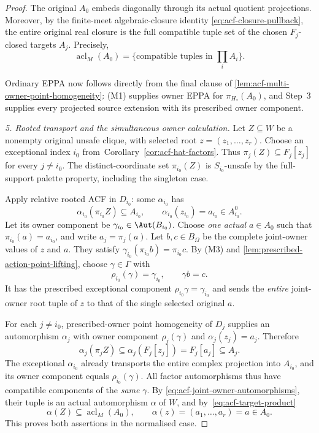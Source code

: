 \begin{proof}
The original \(A_0\) embeds
diagonally through its actual
quotient projections. Moreover,
by the finite-meet algebraic-closure
identity \eqref{eq:acf-closure-pullback},
the entire original real closure
is the full compatible tuple set
of the chosen \(F_j\)-closed
targets \(A_j\). Precisely,
\[
             \operatorname{acl}_M(A_0)
           =\{\text{compatible tuples in }\prod_iA_i\}.
           \tag{\(\square\)}\label{eq:acf-target-product}
\]

Ordinary EPPA now follows directly from the final clause of
\cref{lem:acf-multi-owner-point-homogeneity}: (M1) supplies
owner EPPA for $\pi_{H_*}(A_0)$, and Step~3 supplies every
projected source extension with its prescribed owner component.

\medskip\noindent
\emph{5. Rooted transport and the simultaneous owner calculation.}
Let \(Z\subseteq W\) be a nonempty original
unsafe clique, with selected root
\(z=(z_1,\ldots,z_r)\).
Choose an exceptional index \(i_0\)
from~Corollary~\ref{cor:acf-hat-factors}.  Thus
\(\pi_j(Z)\subseteq F_j[z_j]\)
for every \(j\ne i_0\).
The distinct-coordinate set \(\pi_{i_0}(Z)\)
is \(S_{i_0}\)-unsafe by the full-support
palette property, including the singleton case.

Apply relative rooted ACF in \(D_{i_0}\):
some \(\alpha_{i_0}\) has
\[
 \alpha_{i_0}(\pi_{i_0}Z)\subseteq A_{i_0},
 \qquad
 \alpha_{i_0}(z_{i_0})=a_{i_0}
                           \in A_{i_0}^0.
\]
Let its owner component be
\(\gamma_{i_0}\in\Aut(B_{i_0})\).
Choose \emph{one actual} \(a\in A_0\)
such that \(\pi_{i_0}(a)=a_{i_0}\),
and write \(a_j=\pi_j(a)\).
Let \(b,c\in B_\Omega\) be the
complete joint-owner values of
\(z\) and \(a\).
They satisfy
\(\gamma_{i_0}(\pi_{i_0}b)=\pi_{i_0}c\).
By (M3) and \cref{lem:prescribed-action-point-lifting}, choose
\(\gamma\in\Gamma\) with
\[
 \rho_{i_0}(\gamma)=\gamma_{i_0},\qquad \gamma b=c.
\]
It has the prescribed exceptional
component \(\rho_{i_0}\gamma=\gamma_{i_0}\)
and sends the \emph{entire} joint-owner
root tuple of \(z\) to that of the
single selected original \(a\).

For each \(j\ne i_0\), prescribed-owner
point homogeneity of \(D_j\) supplies
an automorphism \(\alpha_j\) with
owner component \(\rho_j(\gamma)\) and
\(\alpha_j(z_j)=a_j\).  Therefore
\[
 \alpha_j(\pi_j Z)
           \subseteq\alpha_j(F_j[z_j])
           =F_j[a_j]\subseteq A_j.
\]
The exceptional \(\alpha_{i_0}\)
already transports the entire complex
projection into \(A_{i_0}\), and its
owner component equals
\(\rho_{i_0}(\gamma)\).
All factor automorphisms thus have
compatible components of the \emph{same}
\(\gamma\). By \eqref{eq:acf-joint-owner-automorphisms},
their tuple is an actual
automorphism \(\alpha\) of \(W\), and
by~\eqref{eq:acf-target-product}
\[
          \alpha(Z)\subseteq
                    \operatorname{acl}_M(A_0),
             \qquad
          \alpha(z)=(a_1,\ldots,a_r)=a\in A_0 .
\]
This proves both assertions in the
normalised case.


\end{proof}
